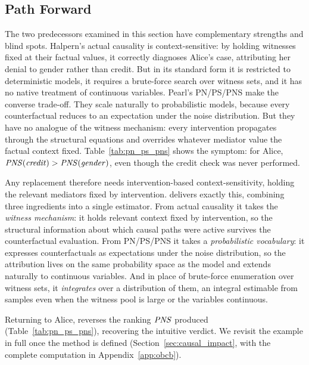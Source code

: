 \subsection{Path Forward}

The two predecessors examined in this section have complementary strengths and blind spots.
Halpern's actual causality is context-sensitive: by holding witnesses fixed at their factual values, it correctly diagnoses Alice's case, attributing her denial to gender rather than credit.
But in its standard form it is restricted to deterministic models, it requires a brute-force search over witness sets, and it has no native treatment of continuous variables.
Pearl's PN/PS/PNS make the converse trade-off.
They scale naturally to probabilistic models, because every counterfactual reduces to an expectation under the noise distribution.
But they have no analogue of the witness mechanism: every intervention propagates through the structural equations and overrides whatever mediator value the factual context fixed.
Table~\ref{tab:pn_ps_pns} shows the symptom: for Alice, $\pns(\varname{credit}) > \pns(\varname{gender})$, even though the credit check was never performed.

Any replacement therefore needs intervention-based context-sensitivity, holding the relevant mediators fixed by intervention.
\ourapproach{} delivers exactly this, combining three ingredients into a single estimator.
From actual causality it takes the \emph{witness mechanism}: it holds relevant context fixed by intervention, so the structural information about which causal paths were active survives the counterfactual evaluation.
From PN/PS/PNS it takes a \emph{probabilistic vocabulary}: it expresses counterfactuals as expectations under the noise distribution, so the attribution lives on the same probability space as the model and extends naturally to continuous variables.
And in place of brute-force enumeration over witness sets, it \emph{integrates} over a distribution of them, an integral estimable from samples even when the witness pool is large or the variables continuous.

Returning to Alice, \ourapproach{} reverses the ranking $\mathit{PNS}$ produced (Table~\ref{tab:pn_ps_pns}), recovering the intuitive verdict.
We revisit the example in full once the method is defined (Section~\ref{sec:causal_impact}, with the complete computation in Appendix~\ref{app:obcb}).

